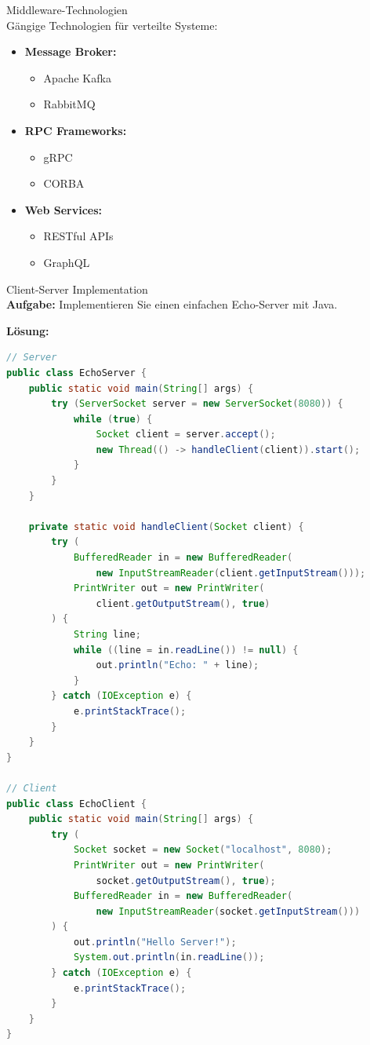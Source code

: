 \begin{concept}{Middleware-Technologien}\\
Gängige Technologien für verteilte Systeme:
\begin{itemize}
    \item \textbf{Message Broker:} 
    \begin{itemize}
        \item Apache Kafka
        \item RabbitMQ
    \end{itemize}
    \item \textbf{RPC Frameworks:}
    \begin{itemize}
        \item gRPC
        \item CORBA
    \end{itemize}
    \item \textbf{Web Services:}
    \begin{itemize}
        \item RESTful APIs
        \item GraphQL
    \end{itemize}
\end{itemize}
\end{concept}

\begin{example}{Client-Server Implementation}\\
\textbf{Aufgabe:} Implementieren Sie einen einfachen Echo-Server mit Java.

\textbf{Lösung:}
\begin{lstlisting}[language=Java, style=base]
// Server
public class EchoServer {
    public static void main(String[] args) {
        try (ServerSocket server = new ServerSocket(8080)) {
            while (true) {
                Socket client = server.accept();
                new Thread(() -> handleClient(client)).start();
            }
        }
    }
    
    private static void handleClient(Socket client) {
        try (
            BufferedReader in = new BufferedReader(
                new InputStreamReader(client.getInputStream()));
            PrintWriter out = new PrintWriter(
                client.getOutputStream(), true)
        ) {
            String line;
            while ((line = in.readLine()) != null) {
                out.println("Echo: " + line);
            }
        } catch (IOException e) {
            e.printStackTrace();
        }
    }
}

// Client
public class EchoClient {
    public static void main(String[] args) {
        try (
            Socket socket = new Socket("localhost", 8080);
            PrintWriter out = new PrintWriter(
                socket.getOutputStream(), true);
            BufferedReader in = new BufferedReader(
                new InputStreamReader(socket.getInputStream()))
        ) {
            out.println("Hello Server!");
            System.out.println(in.readLine());
        } catch (IOException e) {
            e.printStackTrace();
        }
    }
}
\end{lstlisting}
\end{example}

